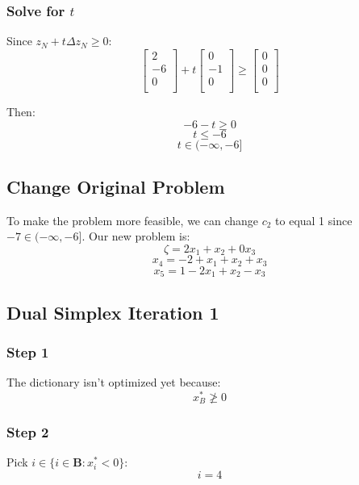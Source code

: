 \documentclass[14pt]{extarticle}
\begin{document}
\subsubsection*{Solve for $t$}
Since $z_N + t\Delta z_N \geq 0$:
\[
    \begin{bmatrix}
        2 \\
        -6 \\
        0 \\
    \end{bmatrix}
    + t \begin{bmatrix}
        0 \\
        -1 \\
        0 \\
    \end{bmatrix}
    \geq \begin{bmatrix}
        0 \\
        0 \\
        0 \\
    \end{bmatrix}
\]

\bigskip Then:
\[
    -6 - t \geq 0
\]
\[
    t \leq -6
\]
\[
    t \in (-\infty, -6]
\]

\subsection*{Change Original Problem}
To make the problem more feasible, we can change $c_2$ to equal 1 since $-7 \in (-\infty, -6]$. Our new problem is:
\[
    \zeta = 2x_1 + x_2 + 0x_3
\]
\[
    x_4 = -2 + x_1 + x_2 + x_3
\]
\[
    x_5 = 1 - 2x_1 + x_2 - x_3
\]

\subsection*{Dual Simplex Iteration 1}
\subsubsection*{Step 1}
The dictionary isn't optimized yet because:
\[
    x^*_B \ngeq 0
\]

\subsubsection*{Step 2}
Pick $i \in \{i \in \boldsymbol{B}: x^*_i < 0\}$:
\[
    i = 4
\]
\end{document}

